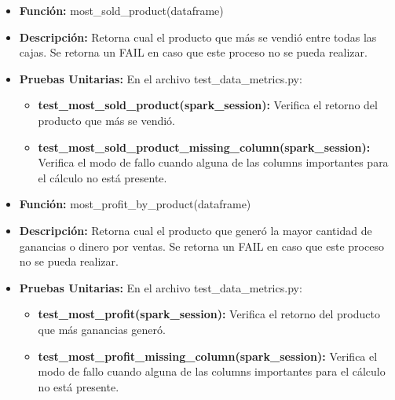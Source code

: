 \documentclass[a4paper]{article}
\begin{document}
\begin{itemize}
        \begin{itemize}
            \item \textbf{Funci\'{o}n:} most\_sold\_product(dataframe)
            \item \textbf{Descripci\'{o}n:} Retorna cual el producto que m\'{a}s se vendi\'{o} entre todas las cajas. Se retorna un FAIL en caso que este proceso no se pueda realizar.
            \item \textbf{Pruebas Unitarias:} En el archivo test\_data\_metrics.py:
                \begin{itemize}
                    \item \textbf{test\_most\_sold\_product(spark\_session):} Verifica el retorno del producto que m\'{a}s se vendi\'{o}.
                    \item \textbf{test\_most\_sold\_product\_missing\_column(spark\_session):} Verifica el modo de fallo cuando alguna de las columns importantes para el c\'{a}lculo no est\'{a} presente.
                \end{itemize}
        \end{itemize}

        \begin{itemize}
            \item \textbf{Funci\'{o}n:} most\_profit\_by\_product(dataframe)
            \item \textbf{Descripci\'{o}n:} Retorna cual el producto que gener\'{o} la mayor cantidad de ganancias o dinero por ventas. Se retorna un FAIL en caso que este proceso no se pueda realizar.
            \item \textbf{Pruebas Unitarias:} En el archivo test\_data\_metrics.py:
                \begin{itemize}
                    \item \textbf{test\_most\_profit(spark\_session):} Verifica el retorno del producto que m\'{a}s ganancias gener\'{o}.
                    \item \textbf{test\_most\_profit\_missing\_column(spark\_session):} Verifica el modo de fallo cuando alguna de las columns importantes para el c\'{a}lculo no est\'{a} presente.
                \end{itemize}
        \end{itemize}


\end{itemize}
\end{document}
